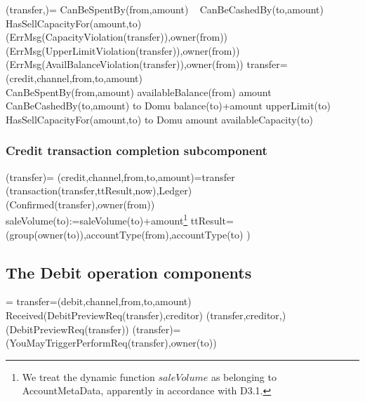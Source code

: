  \begin{asm}
 (transfer,)=\+
 \IF CanBeSpentBy(from,amount) \+
 \THEN ~ \IF CanBeCashedBy(to,amount) \+
 \THEN ~ \IF HasSellCapacityFor(amount,to) \+
 \THEN ~  \-
 \ELSE 
 ~ (ErrMsg(CapacityViolation(transfer)),\TO owner(from))\-
 \ELSE 
 ~ (ErrMsg(UpperLimitViolation(transfer)),\TO owner(from))\-
 \ELSE 
 ~ (ErrMsg(AvailBalanceViolation(transfer)),\TO owner(from))\-
 \WHERE \+
 transfer=(credit,channel,from,to,amount)\\
 CanBeSpentBy(from,amount) \IFF availableBalance(from) \geq amount \\
 CanBeCashedBy(to,amount) \IFF  
 to \not \in Domu \AND balance(to)+amount \leq upperLimit(to) \\
 HasSellCapacityFor(amount,to) \IFF  to \not \in Domu \AND   amount \leq availableCapacity(to)
 \end{asm}
\newpage

 \subsubsection{Credit transaction completion subcomponent}
 \begin{asm}
 	(transfer)=\+  
 	\LET (credit,channel,from,to,amount)=transfer \\ 
 	(transaction(transfer,ttResult,now),Ledger)\\
 	(Confirmed(transfer),\TO owner(from))\\
 	saleVolume(to):=saleVolume(to)+amount\footnote{We treat the dynamic function $saleVolume$ as belonging to AccountMetaData, apparently in accordance with D3.1.} \-
 	\WHERE \+
 	ttResult= (group(owner(to)),accountType(from),accountType(to) )
 \end{asm}
 
 \subsection{The Debit operation components}
 

\begin{asm}
	  =\+
	\LET transfer=(debit,channel,from,to,amount)\\
	\IF Received(DebitPreviewReq(transfer),\FROM creditor) \THEN \+   
	(transfer,creditor,)\\
	(DebitPreviewReq(transfer)) \dec\-
	\WHERE \+
	(transfer)=\+
	  (YouMayTriggerPerformReq(transfer),\TO  owner(to)) 
\end{asm}
 

